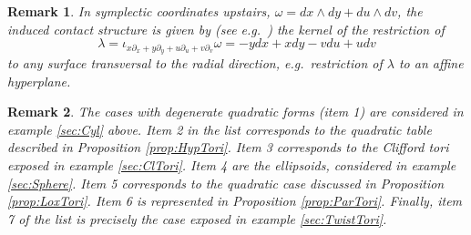 \documentclass{article}
\newtheorem{rmk}{Remark}
\begin{document}
\begin{appendix}
\begin{rmk}
    In symplectic coordinates upstairs, $\omega = dx\wedge dy + du\wedge dv$, the induced contact structure is given by (see e.g.~\cite{ContRed}) the kernel of the restriction of 
    \[ \lambda = \iota_{x\partial_x + y\partial_y + u\partial_u + v\partial_v }\omega = -ydx + xdy - vdu + udv \]
    to any surface transversal to the radial direction, e.g.~restriction of $\lambda$ to an affine hyperplane.%
\end{rmk}

\begin{rmk}
    The cases with degenerate quadratic forms (item 1) are considered in example \ref{sec:Cyl} above. Item 2 in the list corresponds to the quadratic table described in Proposition \ref{prop:HypTori}.
    Item 3 corresponds to the Clifford tori exposed in example \ref{sec:ClTori}. 
    Item 4 are the ellipsoids, considered in example \ref{sec:Sphere}. Item 5 corresponds to the quadratic case discussed in Proposition \ref{prop:LoxTori}. Item 6 is represented in Proposition \ref{prop:ParTori}.
    Finally, item 7 of the list is precisely the case exposed in example \ref{sec:TwistTori}.
\end{rmk}


\end{appendix}
\end{document}

